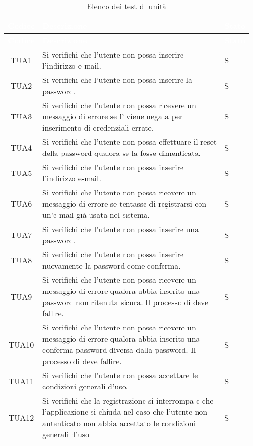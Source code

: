 {
\renewcommand{\arraystretch}{1.5}
\centering
\begin{longtable}{ c C{13cm} C{1cm}}
\caption{Elenco dei test di unità}\\
\textcolor{white}{\textbf{Codice}} & \textcolor{white}{\textbf{Descrizione}} & \textcolor{white}{\textbf{Stato}}\\
\endfirsthead
{}
\textcolor{white}{\textbf{Codice}} & \textcolor{white}{\textbf{Descrizione}} & \textcolor{white}{\textbf{Stato}}\\
\endhead

TUA1 & Si verifichi che l'utente non  possa inserire l'indirizzo e-mail. & S \\
TUA2 & Si verifichi che l'utente non  possa inserire la password. & S \\
TUA3 & Si verifichi che l'utente non  possa ricevere un messaggio di errore se l' viene negata per inserimento di credenziali errate. & S \\
TUA4 & Si verifichi che l'utente non  possa effettuare il reset della password qualora se la fosse dimenticata. & S \\
TUA5 & Si verifichi che l’utente non  possa inserire l'indirizzo e-mail. & S \\
TUA6 & Si verifichi che l’utente non  possa ricevere un messaggio di errore se tentasse di registrarsi con un'e-mail già usata nel sistema.  & S \\
TUA7 & Si verifichi che l’utente non  possa inserire una password. & S \\
TUA8 & Si verifichi che l’utente non  possa inserire nuovamente la password come conferma. & S \\
TUA9 & Si verifichi che l’utente non  possa ricevere un messaggio di errore qualora abbia inserito una password non ritenuta sicura. Il processo di  deve fallire. & S \\
TUA10 & Si verifichi che l’utente non  possa ricevere un messaggio di errore qualora abbia inserito una conferma password diversa dalla password. Il processo di  deve fallire. & S \\
TUA11 & Si verifichi che l’utente non  possa accettare le condizioni generali d'uso. & S \\
TUA12 & Si verifichi che la registrazione si interrompa e che l'applicazione si chiuda nel caso che l'utente non autenticato non abbia accettato le condizioni generali d'uso. & S \\

\end{longtable}}
